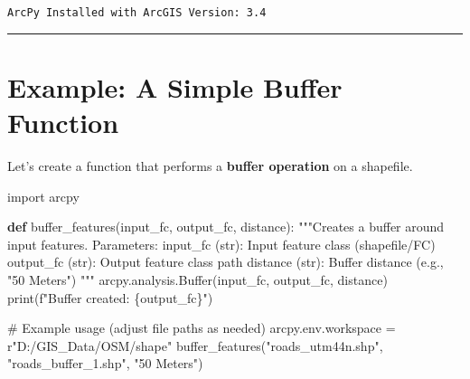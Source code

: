 \documentclass[
  11pt,
  letterpaper,
]{book}
\newenvironment{Shaded}{\begin{snugshade}}{\end{snugshade}}
\newcommand{\BuiltInTok}[1]{\textcolor[rgb]{0.00,0.23,0.31}{#1}}
\newcommand{\CommentTok}[1]{\textcolor[rgb]{0.37,0.37,0.37}{#1}}
\newcommand{\ImportTok}[1]{\textcolor[rgb]{0.00,0.46,0.62}{#1}}
\newcommand{\KeywordTok}[1]{\textcolor[rgb]{0.00,0.23,0.31}{\textbf{#1}}}
\newcommand{\NormalTok}[1]{\textcolor[rgb]{0.00,0.23,0.31}{#1}}
\newcommand{\OperatorTok}[1]{\textcolor[rgb]{0.37,0.37,0.37}{#1}}
\newcommand{\SpecialCharTok}[1]{\textcolor[rgb]{0.37,0.37,0.37}{#1}}
\newcommand{\SpecialStringTok}[1]{\textcolor[rgb]{0.13,0.47,0.30}{#1}}
\newcommand{\StringTok}[1]{\textcolor[rgb]{0.13,0.47,0.30}{#1}}
\newcommand{\VerbatimStringTok}[1]{\textcolor[rgb]{0.13,0.47,0.30}{#1}}
\begin{document}
\begin{verbatim}
ArcPy Installed with ArcGIS Version: 3.4
\end{verbatim}

\begin{center}\rule{0.5\linewidth}{0.5pt}\end{center}

\section{Example: A Simple Buffer
Function}\label{example-a-simple-buffer-function}

Let's create a function that performs a \textbf{buffer operation} on a
shapefile.

\begin{Shaded}
\begin{Highlighting}[]
\ImportTok{import}\NormalTok{ arcpy}

\KeywordTok{def}\NormalTok{ buffer\_features(input\_fc, output\_fc, distance):}
    \CommentTok{"""Creates a buffer around input features.}
\CommentTok{    }
\CommentTok{    Parameters:}
\CommentTok{        input\_fc (str): Input feature class (shapefile/FC)}
\CommentTok{        output\_fc (str): Output feature class path}
\CommentTok{        distance (str): Buffer distance (e.g., "50 Meters")}
\CommentTok{    """}
\NormalTok{    arcpy.analysis.Buffer(input\_fc, output\_fc, distance)}
    \BuiltInTok{print}\NormalTok{(}\SpecialStringTok{f"Buffer created: }\SpecialCharTok{\{}\NormalTok{output\_fc}\SpecialCharTok{\}}\SpecialStringTok{"}\NormalTok{)}

\CommentTok{\# Example usage (adjust file paths as needed)}
\NormalTok{arcpy.env.workspace }\OperatorTok{=} \VerbatimStringTok{r"D:/GIS\_Data/OSM/shape"}
\NormalTok{buffer\_features(}\StringTok{"roads\_utm44n.shp"}\NormalTok{, }\StringTok{"roads\_buffer\_1.shp"}\NormalTok{, }\StringTok{"50 Meters"}\NormalTok{)}
\end{Highlighting}
\end{Shaded}
\end{document}
